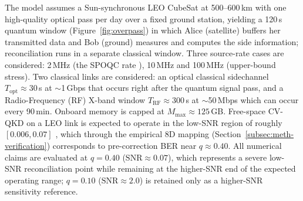 \documentclass{UoYCSproject}
\begin{document}
The model assumes a Sun-synchronous LEO CubeSat at 500--600\,km with one
high-quality optical pass per day over a fixed ground station, yielding a
120\,s quantum window (Figure~\ref{fig:overpass}) in which Alice (satellite)
buffers her transmitted data and Bob (ground) measures and computes the side
information; reconciliation runs in a separate classical window. Three source-rate cases are considered:
2\,MHz (the SPOQC rate \cite{rao_quantum_2025}), 10\,MHz and 100\,MHz (upper-bound stress). 
Two classical links are considered: an optical classical sidechannel
$T_{\text{opt}} \approx 30$\,s at $\sim$1\,Gbps that occurs right after the quantum signal pass, and a Radio-Frequency (RF)
X-band window $T_{\text{RF}} \approx 300$\,s at $\sim$50\,Mbps
\cite{noauthor_hubs_nodate} which can occur every 90\,min. Onboard memory is capped at
$M_{\max} \approx 125$\,GB. Free-space CV-QKD on a LEO link is expected to operate in the low-SNR
region of roughly $[0.006, 0.07]$
\cite{milicevic_quasi-cyclic_2018, noauthor_hubs_nodate}, which through
the empirical 8D mapping (Section~\ref{subsec:meth-verification})
corresponds to pre-correction BER near $q \approx 0.40$. All numerical
claims are evaluated at $q = 0.40$ ($\mathrm{SNR}\!\approx\!0.07$), which represents a severe low-SNR reconciliation point while remaining at the
higher-SNR end of the expected operating range; $q = 0.10$
($\mathrm{SNR}\!\approx\!2.0$) is retained only as a higher-SNR
sensitivity reference.



\end{document}
